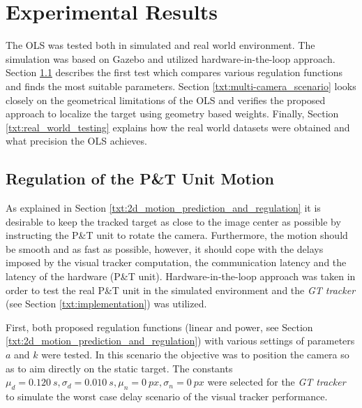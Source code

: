 \chapter{Experimental Results}

The OLS was tested both in simulated and real world environment. The simulation was based on Gazebo and utilized hardware-in-the-loop approach. Section \ref{txt:test_regulation} describes the first test which compares various regulation functions and finds the most suitable parameters. Section \ref{txt:multi-camera_scenario} looks closely on the geometrical limitations of the OLS and verifies the proposed approach to localize the target using geometry based weights. Finally, Section \ref{txt:real_world_testing} explains how the real world datasets were obtained and what precision the OLS achieves.

\section{Regulation of the P\&T Unit Motion} \label{txt:test_regulation}

As explained in Section \ref{txt:2d_motion_prediction_and_regulation} it is desirable to keep the tracked target as close to the image center as possible by instructing the P\&T unit to rotate the camera. Furthermore, the motion should be smooth and as fast as possible, however, it should cope with the delays imposed by the visual tracker computation, the communication latency and the latency of the hardware (P\&T unit). Hardware-in-the-loop approach was taken in order to test the real P\&T unit in the simulated environment and the \textit{GT tracker} (see Section \ref{txt:implementation}) was utilized.

First, both proposed regulation functions (linear and power, see Section \ref{txt:2d_motion_prediction_and_regulation}) with various settings of parameters $a$ and $k$ were tested. In this scenario the objective was to position the camera so as to aim directly on the static target. The constants $\mu_{d} = 0.120~s, \sigma_{d} = 0.010~s, \mu_{n} = 0~px, \sigma_{n} = 0~px$ were selected for the \textit{GT tracker} to simulate the worst case delay scenario of the visual tracker performance.

